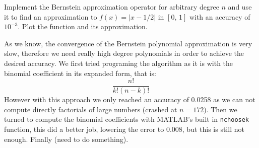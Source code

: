 \begin{problem}
Implement the Bernstein approximation operator for arbitrary degree $n$ and use it to find an approximation to $f(x) = \lvert x - 1/2 \rvert$ in $[0,\, 1]$ with an accuracy of $10^{-3}$. Plot the function and its approximation.
\end{problem}

\begin{solution}
As we know, the convergence of the Bernstein polynomial approximation is very slow, therefore we need really high degree polynomials in order to achieve the desired accuracy. We first tried programing the algorithm as it is with the binomial coefficient in its expanded form, that is:
\begin{equation*}
\frac{n!}{k!(n-k)!}
\end{equation*}
However with this approach we only reached an accuracy of 0.0258 as we can not compute directly factorials of large numbers (crashed at $n = 172$). Then we turned to compute the binomial coefficients with MATLAB's built in \texttt{nchoosek} function, this did a better job, lowering the error to 0.008, but this is still not enough. Finally (need to do something).

\end{solution}